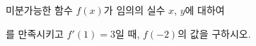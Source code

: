 미분가능한 함수 $f(x)$가 임의의 실수 $x$, $y$에 대하여 \par\smallskip{}\par\smallskip\noindent 를 만족시키고 $f'(1)=3$일 때, $f(-2)$의 값을 구하시오.
